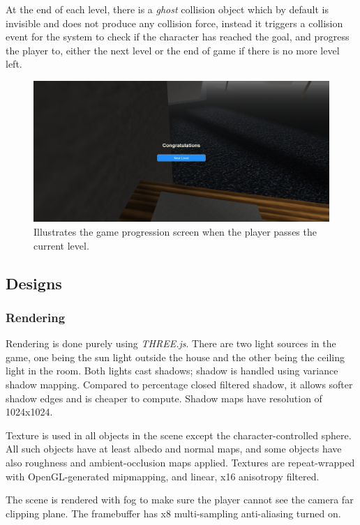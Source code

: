 \documentclass[12pt, a4paper, oneside]{article}
\begin{document}
    At the end of each level, there is a \textit{ghost} collision object which by default is invisible and does not produce any collision force, instead it triggers a collision event for the system to check if the character has reached the goal, and progress the player to, either the next level or the end of game if there is no more level left.

    \begin{figure}[H]
        \includegraphics[width=\textwidth]{progress.png}
        \caption{Illustrates the game progression screen when the player passes the current level.}
    \end{figure}

    \subsection{Designs}

    \subsubsection{Rendering}

    Rendering is done purely using \textit{THREE.js}. There are two light sources in the game, one being the sun light outside the house and the other being the ceiling light in the room. Both lights cast shadows; shadow is handled using variance shadow mapping. Compared to percentage closed filtered shadow, it allows softer shadow edges and is cheaper to compute. Shadow maps have resolution of 1024x1024.

    Texture is used in all objects in the scene except the character-controlled sphere. All such objects have at least albedo and normal maps, and some objects have also roughness and ambient-occlusion maps applied. Textures are repeat-wrapped with OpenGL-generated mipmapping, and linear, x16 anisotropy filtered.

    The scene is rendered with fog to make sure the player cannot see the camera far clipping plane. The framebuffer has x8 multi-sampling anti-aliasing turned on.
\end{document}
